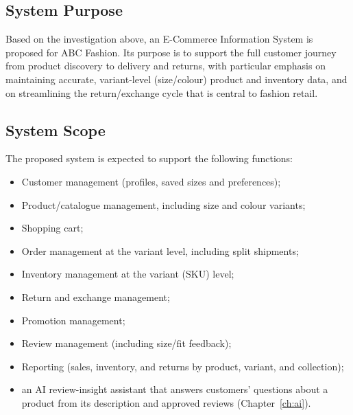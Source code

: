 \documentclass[11pt,a4paper,oneside]{extreport}
\newif\ifshowvtwo
\newcommand{\upd}[1]{\ifshowvtwo\textcolor{red}{#1}\else#1\fi}
\begin{document}
\subsection{System Purpose}
Based on the investigation above, an E-Commerce Information System is proposed for ABC Fashion. Its purpose is to support the full customer journey from product discovery to delivery and returns, with particular emphasis on maintaining accurate, variant-level (size/colour) product and inventory data, and on streamlining the return/exchange cycle that is central to fashion retail.

\subsection{System Scope}
The proposed system is expected to support the following functions:
\begin{itemize}
  \item Customer management (profiles, saved sizes and preferences);
  \item Product/catalogue management, including size and colour variants;
  \item Shopping cart;
  \item Order management at the variant level, including split shipments;
  \item Inventory management at the variant (SKU) level;
  \item Return and exchange management;
  \item Promotion management;
  \item Review management (including size/fit feedback);
  \item Reporting (sales, inventory, and returns by product, variant, and collection);
  \item \upd{an AI review-insight assistant that answers customers' questions about a product from its description and approved reviews (Chapter~\ref{ch:ai}).}
\end{itemize}
\end{document}
